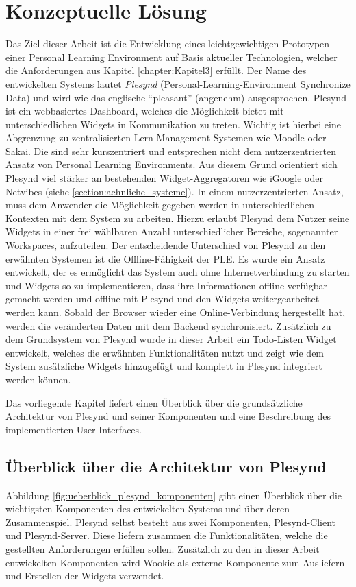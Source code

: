 \chapter{Konzeptuelle Lösung} 
\label{chapter:Kapitel5}
Das Ziel dieser Arbeit ist die Entwicklung eines leichtgewichtigen Prototypen einer Personal Learning Environment auf Basis aktueller Technologien, welcher die Anforderungen aus Kapitel \ref{chapter:Kapitel3} erfüllt. Der Name des entwickelten Systems lautet \emph{Plesynd} (Personal-Learning-Environment Synchronize Data) und wird wie das englische "`pleasant"' (angenehm) ausgesprochen. Plesynd ist ein webbasiertes Dashboard, welches die Möglichkeit bietet mit unterschiedlichen Widgets in Kommunikation zu treten. Wichtig ist hierbei eine Abgrenzung zu zentralisierten Lern-Management-Systemen wie Moodle oder Sakai. Die sind sehr kurszentriert und entsprechen nicht dem nutzerzentrierten Ansatz von Personal Learning Environments. Aus diesem Grund orientiert sich Plesynd viel stärker an bestehenden Widget-Aggregatoren wie iGoogle oder Netvibes (siehe \ref{section:aehnliche_systeme}). In einem nutzerzentrierten Ansatz, muss dem Anwender die Möglichkeit gegeben werden in unterschiedlichen Kontexten mit dem System zu arbeiten. Hierzu erlaubt Plesynd dem Nutzer seine Widgets in einer frei wählbaren Anzahl unterschiedlicher Bereiche, sogenannter Workspaces, aufzuteilen. Der entscheidende Unterschied von Plesynd zu den erwähnten Systemen ist die Offline-Fähigkeit der PLE. Es wurde ein Ansatz entwickelt, der es ermöglicht das System auch ohne Internetverbindung zu starten und Widgets so zu implementieren, dass ihre Informationen offline verfügbar gemacht werden und offline mit Plesynd und den Widgets weitergearbeitet werden kann. Sobald der Browser wieder eine Online-Verbindung hergestellt hat, werden die veränderten Daten mit dem Backend synchronisiert. Zusätzlich zu dem Grundsystem von Plesynd wurde in dieser Arbeit ein Todo-Listen Widget entwickelt, welches die erwähnten Funktionalitäten nutzt und zeigt wie dem System zusätzliche Widgets hinzugefügt und komplett in Plesynd integriert werden können.

Das vorliegende Kapitel liefert einen Überblick über die grundsätzliche Architektur von Plesynd und seiner Komponenten und eine Beschreibung des implementierten User-Interfaces.

\section{Überblick über die Architektur von Plesynd}
Abbildung \ref{fig:ueberblick_plesynd_komponenten} gibt einen Überblick über die wichtigsten Komponenten des entwickelten Systems und über deren Zusammenspiel. Plesynd selbst besteht aus zwei Komponenten, Plesynd-Client und Plesynd-Server. Diese liefern zusammen die Funktionalitäten, welche die gestellten Anforderungen erfüllen sollen. Zusätzlich zu den in dieser Arbeit entwickelten Komponenten wird Wookie als externe Komponente zum Ausliefern und Erstellen der Widgets verwendet.

